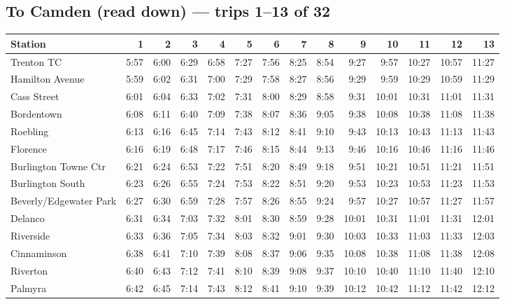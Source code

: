 \subsection*{To Camden (read down) --- trips 1--13 of 32}
\begin{center}\footnotesize\setlength{\tabcolsep}{3pt}\begin{tabular}{@{}lrrrrrrrrrrrrr@{}}\toprule
Station & 1 & 2 & 3 & 4 & 5 & 6 & 7 & 8 & 9 & 10 & 11 & 12 & 13 \\\midrule
Trenton TC & 5:57 & 6:00 & 6:29 & 6:58 & 7:27 & 7:56 & 8:25 & 8:54 & 9:27 & 9:57 & 10:27 & 10:57 & 11:27 \\
Hamilton Avenue & 5:59 & 6:02 & 6:31 & 7:00 & 7:29 & 7:58 & 8:27 & 8:56 & 9:29 & 9:59 & 10:29 & 10:59 & 11:29 \\
Cass Street & 6:01 & 6:04 & 6:33 & 7:02 & 7:31 & 8:00 & 8:29 & 8:58 & 9:31 & 10:01 & 10:31 & 11:01 & 11:31 \\
Bordentown & 6:08 & 6:11 & 6:40 & 7:09 & 7:38 & 8:07 & 8:36 & 9:05 & 9:38 & 10:08 & 10:38 & 11:08 & 11:38 \\
Roebling & 6:13 & 6:16 & 6:45 & 7:14 & 7:43 & 8:12 & 8:41 & 9:10 & 9:43 & 10:13 & 10:43 & 11:13 & 11:43 \\
Florence & 6:16 & 6:19 & 6:48 & 7:17 & 7:46 & 8:15 & 8:44 & 9:13 & 9:46 & 10:16 & 10:46 & 11:16 & 11:46 \\
Burlington Towne Ctr & 6:21 & 6:24 & 6:53 & 7:22 & 7:51 & 8:20 & 8:49 & 9:18 & 9:51 & 10:21 & 10:51 & 11:21 & 11:51 \\
Burlington South & 6:23 & 6:26 & 6:55 & 7:24 & 7:53 & 8:22 & 8:51 & 9:20 & 9:53 & 10:23 & 10:53 & 11:23 & 11:53 \\
Beverly/Edgewater Park & 6:27 & 6:30 & 6:59 & 7:28 & 7:57 & 8:26 & 8:55 & 9:24 & 9:57 & 10:27 & 10:57 & 11:27 & 11:57 \\
Delanco & 6:31 & 6:34 & 7:03 & 7:32 & 8:01 & 8:30 & 8:59 & 9:28 & 10:01 & 10:31 & 11:01 & 11:31 & 12:01 \\
Riverside & 6:33 & 6:36 & 7:05 & 7:34 & 8:03 & 8:32 & 9:01 & 9:30 & 10:03 & 10:33 & 11:03 & 11:33 & 12:03 \\
Cinnaminson & 6:38 & 6:41 & 7:10 & 7:39 & 8:08 & 8:37 & 9:06 & 9:35 & 10:08 & 10:38 & 11:08 & 11:38 & 12:08 \\
Riverton & 6:40 & 6:43 & 7:12 & 7:41 & 8:10 & 8:39 & 9:08 & 9:37 & 10:10 & 10:40 & 11:10 & 11:40 & 12:10 \\
Palmyra & 6:42 & 6:45 & 7:14 & 7:43 & 8:12 & 8:41 & 9:10 & 9:39 & 10:12 & 10:42 & 11:12 & 11:42 & 12:12 \\

\end{tabular}
\end{center}
